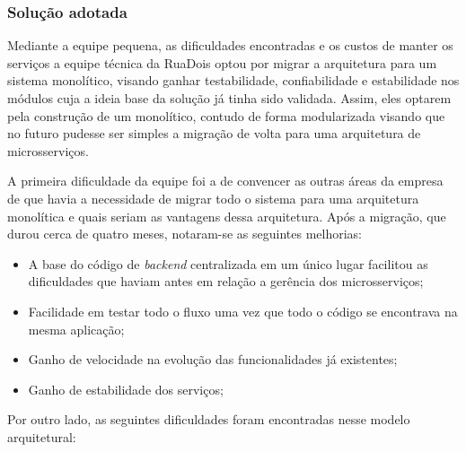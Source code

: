 \subsubsection{Solução adotada}

Mediante a equipe pequena, as dificuldades encontradas e os custos de manter os serviços a equipe
técnica da RuaDois optou por migrar a arquitetura para um sistema monolítico, visando ganhar
testabilidade, confiabilidade e estabilidade nos módulos cuja a ideia base da solução já tinha sido
validada. Assim, eles optarem pela construção de um monolítico, contudo de forma modularizada
visando que no futuro pudesse ser simples a migração de volta para uma arquitetura de
microsserviços.

A primeira dificuldade da equipe foi a de convencer as outras áreas da empresa de que havia a
necessidade de migrar todo o sistema para uma arquitetura monolítica e quais seriam as vantagens
dessa arquitetura. Após a migração, que durou cerca de quatro meses, notaram-se as seguintes melhorias:

\begin{itemize}
    \item A base do código de \textit{backend} centralizada em um único lugar facilitou as
        dificuldades que haviam antes em relação a gerência dos microsserviços;
    \item Facilidade em testar todo o fluxo uma vez que todo o código se encontrava na mesma
        aplicação;
    \item Ganho de velocidade na evolução das funcionalidades já existentes;
    \item Ganho de estabilidade dos serviços;
\end{itemize}

Por outro lado, as seguintes dificuldades foram encontradas nesse modelo arquitetural:

